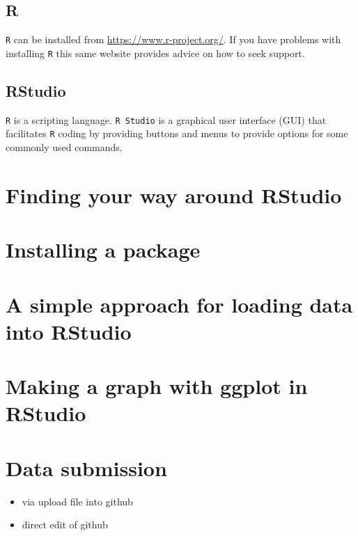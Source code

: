\documentclass[]{book}
\providecommand{\tightlist}{%
  \setlength{\itemsep}{0pt}\setlength{\parskip}{0pt}}
\begin{document}
\section{R}\label{r}

\texttt{R} can be installed from \url{https://www.r-project.org/}. If
you have problems with installing \texttt{R} this same website provides
advice on how to seek support.

\section{RStudio}\label{rstudio}

\texttt{R} is a scripting language. \texttt{R\ Studio} is a graphical
user interface (GUI) that facilitates \texttt{R} coding by providing
buttons and menus to provide options for some commonly used commands.

\chapter{Finding your way around
RStudio}\label{finding-your-way-around-rstudio}

\chapter{Installing a package}\label{installing-a-package}

\chapter{A simple approach for loading data into
RStudio}\label{a-simple-approach-for-loading-data-into-rstudio}

\chapter{Making a graph with ggplot in
RStudio}\label{making-a-graph-with-ggplot-in-rstudio}

\chapter{Data submission}\label{data-submission}

\begin{itemize}
\tightlist
\item
  via upload file into github
\item
  direct edit of github
\end{itemize}


\end{document}
